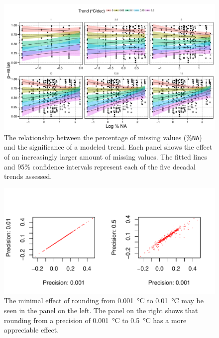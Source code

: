 \documentclass[]{ametsoc}
\begin{document}
\begin{figure}
\centering \includegraphics[width=1.0\textwidth]{figure07}
\caption[\small The relationship between the percentage of missing values (\%\texttt{NA}) and the significance of a fitted trend]{The relationship between the percentage of missing values (\%\texttt{NA}) and the significance of a modeled trend. Each panel shows the effect of an increasingly larger amount of missing values. The fitted lines and 95\% confidence intervals represent each of the five decadal trends assessed.}
\label{figure07}
\end{figure}

\begin{figure}
\centering \includegraphics[width=1.0\textwidth]{figure08}
\caption[\small The minimal effect of rounding from]{The minimal effect of rounding from \SI{0.001}{\degreeCelsius} to \SI{0.01}{\degreeCelsius} may be seen in the panel on the left. The panel on the right shows that rounding from a precision of \SI{0.001}{\degreeCelsius} to \SI{0.5}{\degreeCelsius} has a more appreciable effect.}
\label{figure08}
\end{figure}
\end{document}
